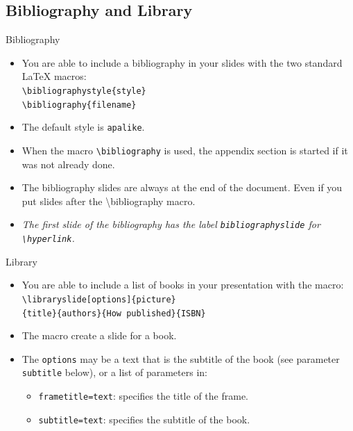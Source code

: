 \documentclass[english,circlenumberstyle]{irtesbeamer}
\begin{document}
\subsection{Bibliography and Library}
\begin{frame}{Bibliography}
	\begin{itemize}
	\item You are able to include a bibliography in your slides with the two standard {\LaTeX} macros: \\
		\texttt{{\textbackslash}bibliographystyle\{style\}} \\
		\texttt{{\textbackslash}bibliography\{filename\}}
	\item The default style is \texttt{apalike}.
	\item When the macro \texttt{{\textbackslash}bibliography} is used, the appendix section is started if it was not already done.
	\item The bibliography slides are \alert{always} at the end of the document. Even if you put slides after the {\textbackslash}bibliography macro.
	\item \emph{The first slide of the bibliography has the label \texttt{bibliographyslide} for \texttt{{\textbackslash}hyperlink}.}
	\end{itemize}
\end{frame}

\begin{frame}{Library}
	\begin{itemize}
	\item You are able to include a list of books in your presentation with the macro: \\
		\texttt{{\textbackslash}libraryslide[options]\{picture\}} \\
		\texttt{\{title\}\{authors\}\{How published\}\{ISBN\}}
	\item The macro create a slide for a book.
	\item The \texttt{options} may be a text that is the subtitle of the book (see parameter \texttt{subtitle} below), or a list of parameters in:
		\begin{itemize}
		\item \texttt{frametitle=text}: specifies the title of the frame.
		\item \texttt{subtitle=text}: specifies the subtitle of the book.
		\end{itemize}
	\end{itemize}
\end{frame}
\end{document}
